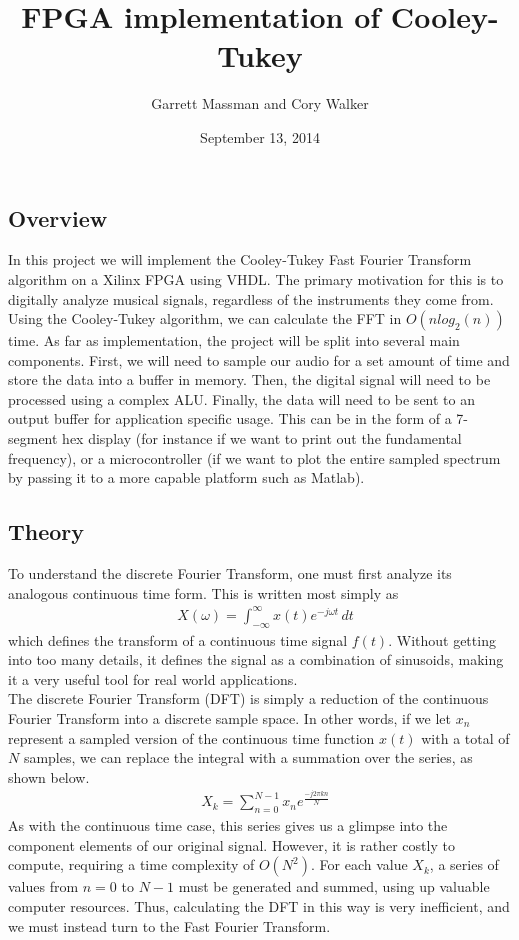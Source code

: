 \documentclass[12pt]{article}
\title{FPGA implementation of Cooley-Tukey}
\date{September 13, 2014}
\author{Garrett Massman and Cory Walker}
\begin{document}
  \maketitle

  \subsection*{Overview}
    In this project we will implement the Cooley-Tukey Fast Fourier Transform algorithm on a Xilinx FPGA using VHDL.
    The primary motivation for this is to digitally analyze musical signals, regardless of the instruments they come from.
    Using the Cooley-Tukey algorithm, we can calculate the FFT in $O(nlog_2(n))$ time.
    As far as implementation, the project will be split into several main components.
    First, we will need to sample our audio for a set amount of time and store the data into a buffer in memory.
    Then, the digital signal will need to be processed using a complex ALU.
    Finally, the data will need to be sent to an output buffer for application specific usage.
    This can be in the form of a 7-segment hex display (for instance if we want to print out the fundamental frequency), or a microcontroller (if we want to plot the entire sampled spectrum by passing it to a more capable platform such as Matlab).

  \subsection*{Theory}
    To understand the discrete Fourier Transform, one must first analyze its analogous continuous time form.
    This is written most simply as
    \begin{align*}
    &X(\omega) = \int_{-\infty}^{\infty} x(t) e^{-j \omega t}\,dt
    \end{align*}
    which defines the transform of a continuous time signal $f(t)$.
    Without getting into too many details, it defines the signal as a combination of sinusoids, making it a very useful tool for real world applications.\\
    
    The discrete Fourier Transform (DFT) is simply a reduction of the continuous Fourier Transform into a discrete sample space.
    In other words, if we let $x_n$ represent a sampled version of the continuous time function $x(t)$ with a total of $N$ samples, we can replace the integral with a summation over the series, as shown below.
    \begin{align*}
        &X_k = \sum\limits_{n=0}^{N-1} x_n e^{\frac{-j2\pi kn}{N}}
    \end{align*}
    As with the continuous time case, this series gives us a glimpse into the component elements of our original signal.
    However, it is rather costly to compute, requiring a time complexity of $O(N^2)$.
    For each value $X_k$, a series of values from $n = 0$ to $N - 1$ must be generated and summed, using up valuable computer resources.
    Thus, calculating the DFT in this way is very inefficient, and we must instead turn to the Fast Fourier Transform.\\
\end{document}
